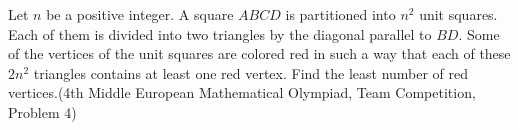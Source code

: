 Let $n$ be a positive integer. A square $ABCD$ is partitioned into $n^2$ unit squares. Each of them is divided into two triangles by the diagonal parallel to $BD$. Some of the vertices of the unit squares are colored red in such a way that each of these $2n^2$ triangles contains at least one red vertex. Find the least number of red vertices.(4th Middle European Mathematical Olympiad, Team Competition, Problem 4)
